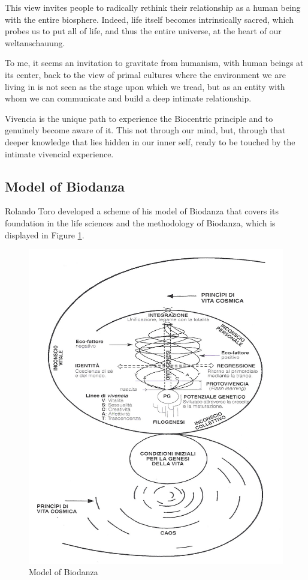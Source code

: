 \documentclass[
]{article}
\begin{document}
This view invites people to radically rethink their relationship as a human being with the entire biosphere. Indeed, life itself becomes intrinsically sacred, which probes us to put all of life, and thus the entire universe, at the heart of our weltanschauung.

To me, it seems an invitation to gravitate from humanism, with human beings at its center, back to the view of primal cultures where the environment we are living in is not seen as the stage upon which we tread, but as an entity with whom we can communicate and build a deep intimate relationship.

Vivencia is the unique path to experience the Biocentric principle and to genuinely become aware of it. This not through our mind, but, through that deeper knowledge that lies hidden in our inner self, ready to be touched by the intimate vivencial experience.

\hypertarget{model-of-biodanza}{%
\subsection{Model of Biodanza}\label{model-of-biodanza}}

Rolando Toro developed a scheme of his model of Biodanza that covers its foundation in the life sciences and the methodology of Biodanza, which is displayed in Figure \ref{fig:model}.

\begin{figure}

{\centering \includegraphics[width=1\linewidth]{./figs/biodanzaModel} 

}

\caption{Model of Biodanza}\label{fig:model}
\end{figure}
\end{document}

